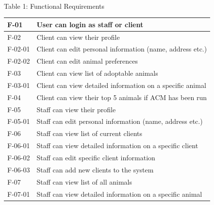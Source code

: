 \documentclass{article}
\begin{document}
 \\

Table 1: Functional Requirements\\
\begin{tabular}{ll}

\hline
F-01 & User can login as staff or client \\ \hline

F-02 & Client can view their profile \\ \hline

\indent F-02-01 & Client can edit personal information (name, address etc.) \\ \hline

\indent F-02-02 & Client can edit animal preferences \\ \hline

F-03 & Client can view list of adoptable animals \\ \hline

\indent F-03-01 & Client can view detailed information on a specific animal \\ \hline

F-04 & Client can view their top 5 animals if ACM has been run \\ \hline

F-05 & Staff can view their profile \\ \hline

\indent F-05-01 & Staff can edit personal information (name, address etc.) \\ \hline

F-06 & Staff can view list of current clients \\ \hline

\indent F-06-01 & Staff can view detailed information on a specific client \\ \hline

\indent F-06-02 & Staff can edit specific client information \\ \hline

\indent F-06-03 & Staff can add new clients to the system \\ \hline

F-07 & Staff can view list of all animals \\ \hline

\indent F-07-01 & Staff can view detailed information on a specific animal \\ \hline


\end{tabular}
\end{document}
